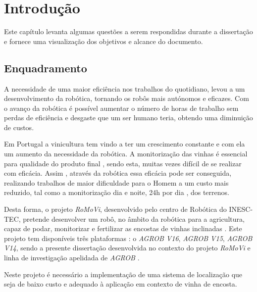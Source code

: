 \chapter{Introdução} \label{chap:introdução}
Este capítulo levanta algumas questões a serem respondidas durante a dissertação e fornece uma  visualização dos objetivos e alcance do documento.
 
\section{Enquadramento} \label{sec:enquadramento}
A necessidade de uma maior eficiência nos trabalhos do quotidiano, levou a um desenvolvimento da robótica, tornando os robôs mais autónomos e eficazes. Com o avanço da robótica é possível aumentar o número de horas de trabalho sem perdas de eficiência e desgaste que um ser humano teria, obtendo uma diminuição de custos.

Em Portugal a vinicultura tem vindo a ter um crescimento constante e com ela um aumento da necessidade da robótica. A monitorização das vinhas é essencial para qualidade do produto final , sendo esta, muitas vezes difícil de se realizar com eficácia. Assim , através da robótica essa eficácia pode ser conseguida, realizando trabalhos de maior dificuldade para o Homem a um custo mais reduzido, tal como a monitorização dia e noite, 24h por dia , dos terrenos. 

Desta forma, o projeto \textit{RoMoVi}, desenvolvido pelo centro de Robótica do INESC-TEC, pretende desenvolver um robô, no âmbito da robótica para a agricultura, capaz de podar, monitorizar e fertilizar as encostas de vinhas inclinadas \cite{Mendes2016}. Este projeto tem disponíveis três plataformas : o \textit{AGROB V16}, \textit{AGROB V15}, \textit{AGROB V14}, sendo a presente dissertação desenvolvida no contexto do projeto \textit{RoMoVi} e linha de investigação apelidada de \textit{AGROB} \cite{RN32}.

Neste projeto é necessário a implementação de uma sistema de localização que seja de baixo custo e adequado à aplicação em contexto de vinha de encosta.

